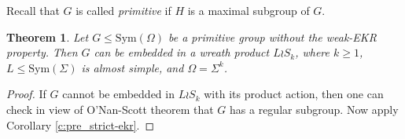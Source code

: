 \documentclass[twoside,a4paper,reqno,11pt]{amsart}
\newcommand{\normeq}{\trianglelefteqslant}
\newcommand{\<}{\langle}
\renewcommand{\>}{\rangle}
\newcommand{\leqs}{\leqslant}
\newcommand{\geqs}{\geqslant}
\newcommand{\Aut}{\mathrm{Aut}}
\newcommand{\Inn}{\mathrm{Inn}}
\newtheorem{thm}{Theorem}[section]
\theoremstyle{definition}
\begin{document}
	Recall that $G$ is called \textit{primitive} if $H$ is a maximal subgroup of $G$.
	
	
	
	
	\begin{thm}
		\label{t:pre_prim_large}
		Let $G\leqs\mathrm{Sym}(\Omega)$ be a primitive group without the weak-EKR property. Then $G$ can be embedded in a wreath product $L\wr S_k$, where $k\geqs 1$, $L\leqs \mathrm{Sym}(\Sigma)$ is almost simple, and $\Omega = \Sigma^k$.
	\end{thm}
	
	\begin{proof}
		If $G$ cannot be embedded in $L\wr S_k$ with its product action, then one can check in view of O'Nan-Scott theorem \cite{LPS_O'Nan-Scott} that $G$ has a regular subgroup. Now apply Corollary \ref{c:pre_strict-ekr}.
	\end{proof}
	
\end{document}
